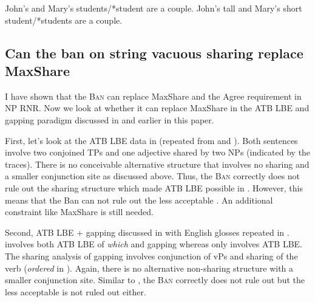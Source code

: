 \documentclass[output=paper]{langscibook}
\begin{document}
\ea 
	\label{shenex32}
	\ea 
		John's and Mary's students/*student are a couple.
	\ex 
		John's tall and Mary's short student/*students are a couple.
	\z 
\z 

\subsection{Can the ban on string vacuous sharing replace MaxShare}
\label{shensect:replace}

I have shown that the \textsc{Ban} can replace MaxShare and the Agree requirement in NP RNR. Now we look at whether it can replace MaxShare in the ATB LBE and gapping paradigm discussed in \cite{Citko:2006} and earlier in this paper.

First, let's look at the ATB LBE data in  (repeated from  and ). 
Both sentences involve two conjoined TPs and one adjective shared by two NPs (indicated by the traces). 
There is no conceivable alternative structure that involves no sharing and a smaller conjunction site as discussed above.  
Thus, the \textsc{Ban} correctly does not rule out the sharing structure which made ATB LBE possible in . 
However, this means that the Ban can not rule out the less acceptable . 
An additional constraint like MaxShare is still needed.

\ea 
	\label{shenex33}
	\z 
\z 
Second, ATB LBE + gapping discussed in  with English glosses repeated in .  involves both ATB LBE of \textit{which} and gapping whereas  only involves ATB LBE.
The sharing analysis of gapping involves conjunction of vPs and sharing of the verb (\textit{ordered} in ). Again, there is no alternative non-sharing structure with a smaller conjunction site. Similar to ,  the \textsc{Ban} correctly does not rule out  but the less acceptable  is not ruled out either.
\end{document}
